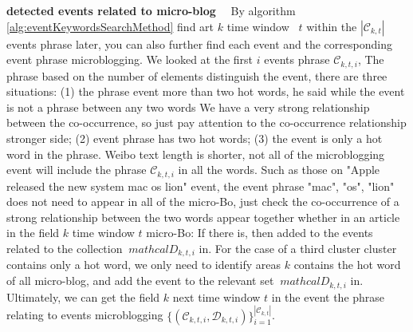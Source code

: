 \documentclass[conference,compsoc]{IEEEtran}
\begin{document}
\textbf{detected events related to micro-blog}
\ \
By algorithm \ref{alg:eventKeywordsSearchMethod} find art \(k \) time window \ \(t \) within the \(| \mathcal{C}_{k, t} | \) events phrase later, you can also further find each event and the corresponding event phrase microblogging.
We looked at the first \(i \) events phrase \(\mathcal{C}_{k, t, i} \),
The phrase based on the number of elements distinguish the event, there are three situations: (1) the phrase event more than two hot words, he said while the event is not a phrase between any two words We have a very strong relationship between the co-occurrence, so just pay attention to the co-occurrence relationship stronger side; (2) event phrase has two hot words; (3) the event is only a hot word in the phrase.
Weibo text length is shorter, not all of the microblogging event will include the phrase \(\mathcal{C}_{k, t, i} \) in all the words.
Such as those on "Apple released the new system mac os lion" event, the event phrase "mac", "os", "lion" does not need to appear in all of the micro-Bo, just check the co-occurrence of a strong relationship between the two words appear together whether in an article in the field \(k \) time window \(t \) micro-Bo: If there is, then added to the events related to the collection \(\ mathcal {D} _ {k, t, i} \) in.
For the case of a third cluster cluster contains only a hot word, we only need to identify areas \(k \) contains the hot word of all micro-blog, and add the event to the relevant set \(\ mathcal{D }_{k, t, i} \) in.
Ultimately, we can get the field \(k \) next time window \(t \) in the event the phrase relating to events microblogging \(\{(\mathcal{C}_{k, t, i}, \mathcal{D}_{k, t, i}) \}_{i=1}^{| \mathcal{C}_{k, t} |} \).
\end{document}
